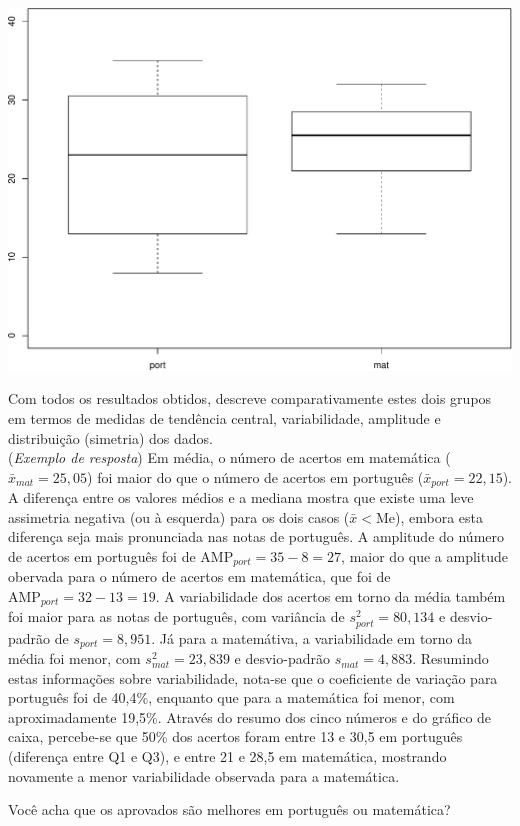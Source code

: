 \documentclass[a4paper,11pt,fleqn]{article}\usepackage[]{graphicx}\usepackage[]{color}
\newenvironment{knitrout}{}{} %
\theoremstyle{definition}
\begin{document}
\begin{compactenum}[5.]
\begin{compactenum}
\begin{knitrout}
{\centering \includegraphics[width=.5\textwidth]{figure/unnamed-chunk-7-1} 

}



\end{knitrout}

\item Com todos os resultados obtidos, descreve comparativamente estes
    dois grupos em termos de medidas de tendência central,
    variabilidade, amplitude e distribuição (simetria) dos dados.\\
    (\textit{Exemplo de resposta}) Em média, o número de acertos em
    matemática ($\bar{x}_{mat} = 25,05$) foi maior do que o número de
    acertos em português ($\bar{x}_{port} = 22,15$). A diferença entre
    os valores médios e a mediana mostra que existe uma leve assimetria
    negativa (ou à esquerda) para os dois casos ($\bar{x} < \text{Me}$),
    embora esta diferença seja mais pronunciada nas notas de
    português. A amplitude do número de acertos em português foi de
    $\text{AMP}_{port} = 35-8=27$, maior do que a amplitude obervada
    para o número de acertos em matemática, que foi de
    $\text{AMP}_{port} = 32-13=19$. A variabilidade dos acertos em torno
    da média também foi maior para as notas de português, com variância
    de $s^2_{port} = 80,134$ e desvio-padrão de $s_{port} = 8,951$. Já
    para a matemátiva, a variabilidade em torno da média foi menor, com
    $s^2_{mat} = 23,839$ e desvio-padrão $s_{mat} = 4,883$. Resumindo
    estas informações sobre variabilidade, nota-se que o coeficiente de
    variação para português foi de 40,4\%, enquanto que para a
    matemática foi menor, com aproximadamente 19,5\%. Através do resumo
    dos cinco números e do gráfico de caixa, percebe-se que 50\% dos
    acertos foram entre 13 e 30,5 em português (diferença entre Q1 e
    Q3), e entre 21 e 28,5 em matemática, mostrando novamente a menor
    variabilidade observada para a matemática.
  \item Você acha que os aprovados são melhores em português ou
    matemática?
  \end{compactenum}
\end{compactenum}
\end{document}
